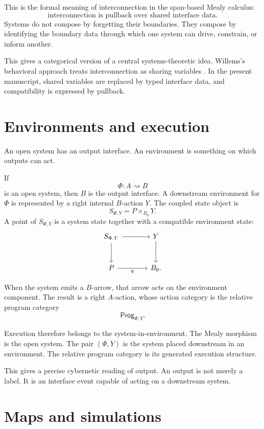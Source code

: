 This is the formal meaning of interconnection in the span-based Mealy
calculus:
\[
  \boxed{
  \text{interconnection is pullback over shared interface data.}
  }
\]
Systems do not compose by forgetting their boundaries.  They compose by
identifying the boundary data through which one system can drive, constrain,
or inform another.

This gives a categorical version of a central systems-theoretic idea.
Willems's behavioral approach treats interconnection as sharing variables
\cite{Willems2007InterconnectionSharingVariables}.  In the present manuscript,
shared variables are replaced by typed interface data, and compatibility is
expressed by pullback.

\section{Environments and execution}
\label{sec:environments-and-execution}

An open system has an output interface.  An environment is something on which
outputs can act.

If
\[
  \Phi:A\rightsquigarrow B
\]
is an open system, then \(B\) is the output interface.  A downstream
environment for \(\Phi\) is represented by a right internal \(B\)-action
\(Y\).  The coupled state object is
\[
  S_{\Phi,Y}=P\times_{B_0}Y.
\]
A point of \(S_{\Phi,Y}\) is a system state together with a compatible
environment state:
\[
\begin{tikzcd}[column sep=large,row sep=large]
  S_{\Phi,Y}
    \ar[r]
    \ar[d]
  &
  Y
    \ar[d]
  \\
  P
    \ar[r,"q"']
  &
  B_0 .
\end{tikzcd}
\]

When the system emits a \(B\)-arrow, that arrow acts on the environment
component.  The result is a right \(A\)-action, whose action category is the
relative program category
\[
  \mathsf{Prog}_{\Phi,Y}.
\]

Execution therefore belongs to the system-in-environment.  The Mealy morphism
is the open system.  The pair \((\Phi,Y)\) is the system placed downstream in
an environment.  The relative program category is its generated execution
structure.

This gives a precise cybernetic reading of output.  An output is not merely a
label.  It is an interface event capable of acting on a downstream system.

\section{Maps and simulations}
\label{sec:maps-and-simulations}

